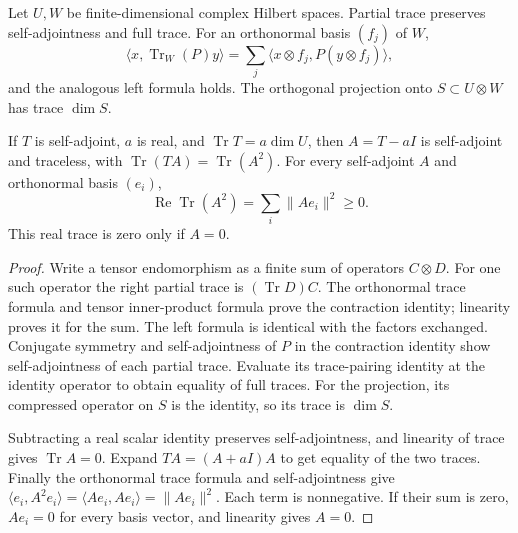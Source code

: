 \begin{lemma}
\label{lem:partial-trace-defect}
\leanok
Let $U,W$ be finite-dimensional complex Hilbert spaces. Partial trace
preserves self-adjointness and full trace. For an orthonormal basis
$(f_j)$ of $W$,
\[
 \langle x,\operatorname{Tr}_W(P)y\rangle
 =\sum_j\langle x\otimes f_j,P(y\otimes f_j)\rangle,
\]
and the analogous left formula holds. The orthogonal projection onto
$S\subset U\otimes W$ has trace $\dim S$.

If $T$ is self-adjoint, $a$ is real, and
$\operatorname{Tr}T=a\dim U$, then $A=T-aI$ is self-adjoint and
traceless, with $\operatorname{Tr}(TA)=\operatorname{Tr}(A^2)$.
For every self-adjoint $A$ and orthonormal basis $(e_i)$,
\[
 \operatorname{Re}\operatorname{Tr}(A^2)
 =\sum_i\|Ae_i\|^2\geq0.
\]
This real trace is zero only if $A=0$.
\end{lemma}
\begin{proof}
Write a tensor endomorphism as a finite sum of operators $C\otimes D$.
For one such operator the right partial trace is $(\operatorname{Tr}D)C$.
The orthonormal trace formula and tensor inner-product formula prove the
contraction identity; linearity proves it for the sum. The left formula
is identical with the factors exchanged. Conjugate symmetry and
self-adjointness of $P$ in the contraction identity show self-adjointness
of each partial trace. Evaluate its trace-pairing identity at the identity
operator to obtain equality of full traces. For the projection, its
compressed operator on $S$ is the identity, so its trace is $\dim S$.

Subtracting a real scalar identity preserves self-adjointness, and
linearity of trace gives $\operatorname{Tr}A=0$. Expand
$TA=(A+aI)A$ to get equality of the two traces. Finally the orthonormal
trace formula and self-adjointness give
$\langle e_i,A^2e_i\rangle=\langle Ae_i,Ae_i\rangle=\|Ae_i\|^2$.
Each term is nonnegative. If their sum is zero, $Ae_i=0$ for every basis
vector, and linearity gives $A=0$.
\end{proof}

